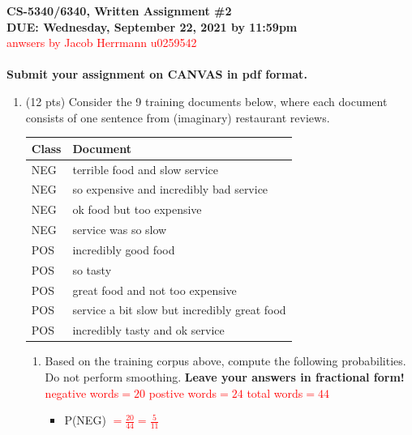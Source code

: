 \documentclass[11pt]{article}
\begin{document}
\large
\begin{center}
{\bf CS-5340/6340, Written Assignment \#2} \\
{\bf DUE: Wednesday, September 22, 2021 by 11:59pm} \\ \textcolor{red}{anwsers by Jacob Herrmann u0259542}\\ ~ \\

{\bf  Submit your assignment on CANVAS in pdf format.}
\end{center}
\normalsize

\begin{enumerate}  


\item (12 pts) Consider the 9 training documents below, where each
  document consists of one sentence from (imaginary) restaurant reviews. 

\begin{center}
\begin{tabular}{|l|l|} \hline
{\bf Class} & {\bf Document} \\ \hline \hline
NEG & terrible food and slow service \\ \hline
NEG & so expensive and incredibly bad service \\ \hline
NEG & ok food but too expensive \\ \hline
NEG & service was so slow \\ \hline
POS & incredibly good food \\ \hline
POS & so tasty \\ \hline
POS & great food and not too expensive  \\ \hline
POS & service a bit slow but incredibly great food \\ \hline
POS & incredibly tasty and ok service \\ \hline
\end{tabular}
\end{center}

\hspace*{.3in}
\begin{enumerate}
\item Based on the training corpus above, compute the following
probabilities. Do not perform smoothing.  {\bf Leave your answers in
  fractional form!} 
  \textcolor{red}{negative words$=20$}
  \textcolor{red}{postive words$=24$}
  \textcolor{red}{total words$=44$}
\begin{itemize}
\item  P(NEG) 
\textcolor{red}{$=\frac{20}{44}=\frac{5}{11}$}


\end{itemize}
\end{enumerate}
\end{enumerate}
\end{document}
